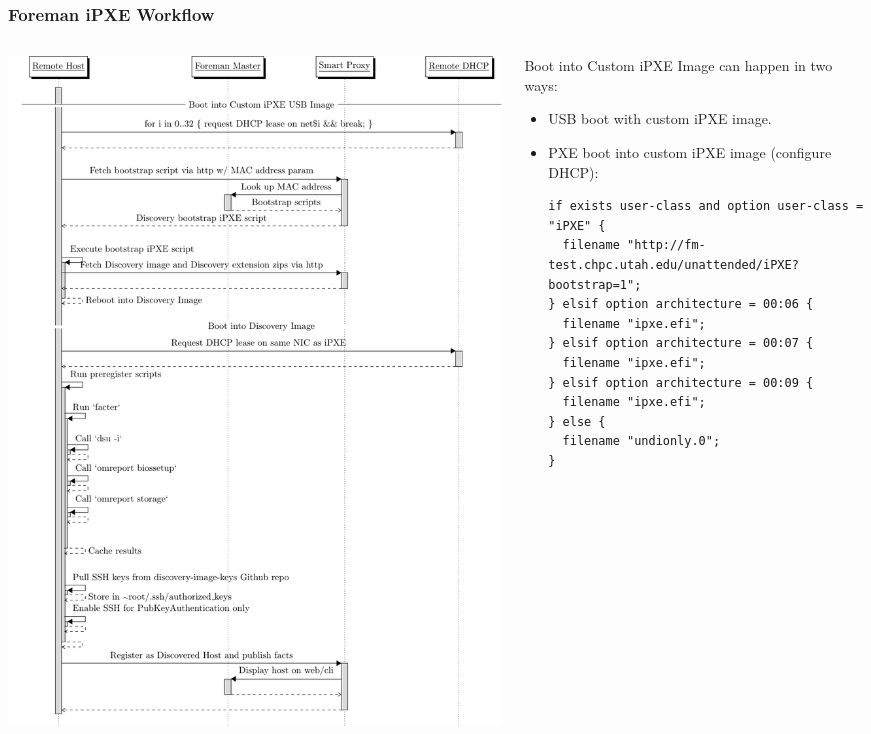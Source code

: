 \documentclass{beamer}
\begin{document}
\begin{frame}[fragile]
	\frametitle{Foreman iPXE Workflow}

	\begin{columns}
		\begin{column}{0.5\textwidth}
			\flushleft
			\includegraphics[width=\textwidth,height=\textheight-15mm,keepaspectratio]{discovery_sd}
		\end{column}

		\begin{column}{0.5\textwidth}
			Boot into Custom iPXE Image can happen in two ways:
			\begin{itemize}
				\item USB boot with custom iPXE image.
				\item PXE boot into custom iPXE image (configure DHCP):
				      \begin{lstlisting}[frame=single,basicstyle=\fontsize{3.5}{6pt}\selectfont]
if exists user-class and option user-class = "iPXE" {
  filename "http://fm-test.chpc.utah.edu/unattended/iPXE?bootstrap=1";
} elsif option architecture = 00:06 {
  filename "ipxe.efi";
} elsif option architecture = 00:07 {
  filename "ipxe.efi";
} elsif option architecture = 00:09 {
  filename "ipxe.efi";
} else {
  filename "undionly.0";
}
          \end{lstlisting}
			\end{itemize}
		\end{column}
	\end{columns}
\end{frame}
\end{document}
